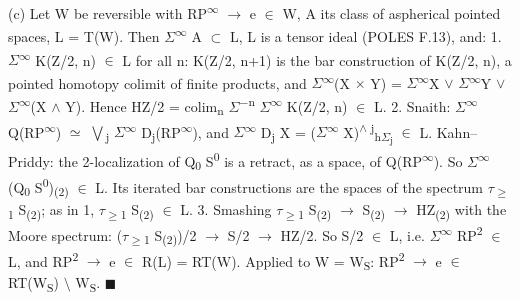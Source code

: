 (c) Let W be reversible with RP\textsuperscript{\ensuremath{\infty}} \ensuremath{\to} e \ensuremath{\in} W, A its class of aspherical pointed spaces, L = T(W). Then \ensuremath{\Sigma}\textsuperscript{\ensuremath{\infty}} A \ensuremath{\subset} L, L is a tensor ideal (POLES F.13), and: 1. \ensuremath{\Sigma}\textsuperscript{\ensuremath{\infty}} K(Z/2, n) \ensuremath{\in} L for all n: K(Z/2, n+1) is the bar construction of K(Z/2, n), a pointed homotopy    colimit of finite products, and \ensuremath{\Sigma}\textsuperscript{\ensuremath{\infty}}(X \ensuremath{\times} Y) = \ensuremath{\Sigma}\textsuperscript{\ensuremath{\infty}}X \ensuremath{\vee} \ensuremath{\Sigma}\textsuperscript{\ensuremath{\infty}}Y \ensuremath{\vee} \ensuremath{\Sigma}\textsuperscript{\ensuremath{\infty}}(X \ensuremath{\wedge} Y). Hence    HZ/2 = colim\textsubscript{n} \ensuremath{\Sigma}\textsuperscript{\ensuremath{-}n} \ensuremath{\Sigma}\textsuperscript{\ensuremath{\infty}} K(Z/2, n) \ensuremath{\in} L. 2. Snaith: \ensuremath{\Sigma}\textsuperscript{\ensuremath{\infty}} Q(RP\textsuperscript{\ensuremath{\infty}}) \ensuremath{\simeq} \ensuremath{\bigvee}\textsubscript{j} \ensuremath{\Sigma}\textsuperscript{\ensuremath{\infty}} D\textsubscript{j}(RP\textsuperscript{\ensuremath{\infty}}), and \ensuremath{\Sigma}\textsuperscript{\ensuremath{\infty}} D\textsubscript{j} X = (\ensuremath{\Sigma}\textsuperscript{\ensuremath{\infty}} X)\textsuperscript{\ensuremath{\wedge} j}\textsubscript{h\ensuremath{\Sigma}\textsubscript{j}} \ensuremath{\in} L. Kahn--Priddy: the    2-localization of Q\textsubscript{0} S\textsuperscript{0} is a retract, as a space, of Q(RP\textsuperscript{\ensuremath{\infty}}). So \ensuremath{\Sigma}\textsuperscript{\ensuremath{\infty}} (Q\textsubscript{0} S\textsuperscript{0})\textsubscript{(2)} \ensuremath{\in} L. Its iterated    bar constructions are the spaces of the spectrum \ensuremath{\tau}\textsubscript{\ensuremath{\geq}1} S\textsubscript{(2)}; as in 1, \ensuremath{\tau}\textsubscript{\ensuremath{\geq}1} S\textsubscript{(2)} \ensuremath{\in} L. 3. Smashing \ensuremath{\tau}\textsubscript{\ensuremath{\geq}1} S\textsubscript{(2)} \ensuremath{\to} S\textsubscript{(2)} \ensuremath{\to} HZ\textsubscript{(2)} with the Moore spectrum: (\ensuremath{\tau}\textsubscript{\ensuremath{\geq}1} S\textsubscript{(2)})/2 \ensuremath{\to} S/2 \ensuremath{\to} HZ/2. So    S/2 \ensuremath{\in} L, i.e. \ensuremath{\Sigma}\textsuperscript{\ensuremath{\infty}} RP\textsuperscript{2} \ensuremath{\in} L, and RP\textsuperscript{2} \ensuremath{\to} e \ensuremath{\in} R(L) = RT(W). Applied to W = W\textsubscript{S}: RP\textsuperscript{2} \ensuremath{\to} e \ensuremath{\in} RT(W\textsubscript{S}) \ensuremath{\setminus} W\textsubscript{S}. \ensuremath{\blacksquare}

